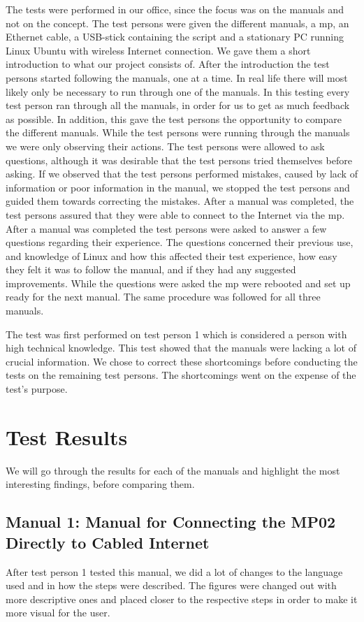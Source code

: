 The tests were performed in our office, since the focus was on the manuals and not on the concept. The test persons were given the different manuals, a \gls{mp}, an Ethernet cable, a USB-stick containing the script and a stationary PC running Linux Ubuntu with wireless Internet connection. We gave them a short introduction to what our project consists of. After the introduction the test persons started following the manuals, one at a time. In real life there will most likely only be necessary to run through one of the manuals. In this testing every test person ran through all the manuals, in order for us to get as much feedback as possible. In addition, this gave the test persons the opportunity to compare the different manuals. While the test persons were running through the manuals we were only observing their actions. The test persons were allowed to ask questions, although it was desirable that the test persons tried themselves before asking. If we observed that the test persons performed mistakes, caused by lack of information or poor information in the manual, we stopped the test persons and guided them towards correcting the mistakes. After a manual was completed, the test persons assured that they were able to connect to the Internet via the \gls{mp}. After a manual was completed the test persons were asked to answer a few questions regarding their experience. The questions concerned their previous use, and knowledge of Linux and how this affected their test experience, how easy they felt it was to follow the manual, and if they had any suggested improvements.
While the questions were asked the \gls{mp} were rebooted and set up ready for the next manual. The same procedure was followed for all three  manuals. 

The test was first performed on test person 1 which is considered a person with high technical knowledge. This test showed that the manuals were lacking a lot of crucial information. We chose to correct these shortcomings before conducting the tests on the remaining test persons. The shortcomings went on the expense of the test's purpose. 

\section{Test Results}
We will go through the results for each of the manuals and highlight the most interesting findings, before comparing them. 
 
\subsection{Manual 1: Manual for Connecting the MP02 Directly to Cabled Internet}
After test person 1 tested this manual, we did a lot of changes to the language used and in how the steps were described. The figures were changed out with more descriptive ones and placed closer to the respective steps in order to make it more visual for the user. 

